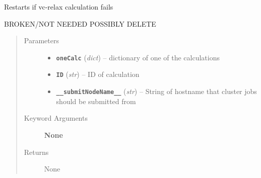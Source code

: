\documentclass[letterpaper,10pt,english]{sphinxmanual}
\begin{document}
\begin{fulllineitems}
\label{run:run.__vcrelax_error_restart}
Restarts if vc-relax calculation fails

BROKEN/NOT NEEDED POSSIBLY DELETE
\begin{quote}\begin{description}
\item[{Parameters}] \leavevmode\begin{itemize}
\item {} 
\textbf{\texttt{oneCalc}} (\emph{dict}) -- dictionary of one of the calculations

\item {} 
\textbf{\texttt{ID}} (\emph{str}) -- ID of calculation

\item {} 
\textbf{\texttt{\_\_submitNodeName\_\_}} (\emph{str}) -- String of hostname that cluster jobs should be submitted from

\end{itemize}

\item[{Keyword Arguments}] \leavevmode
\textbf{None}

\item[{Returns}] \leavevmode
None

\end{description}\end{quote}

\end{fulllineitems}

\end{document}
